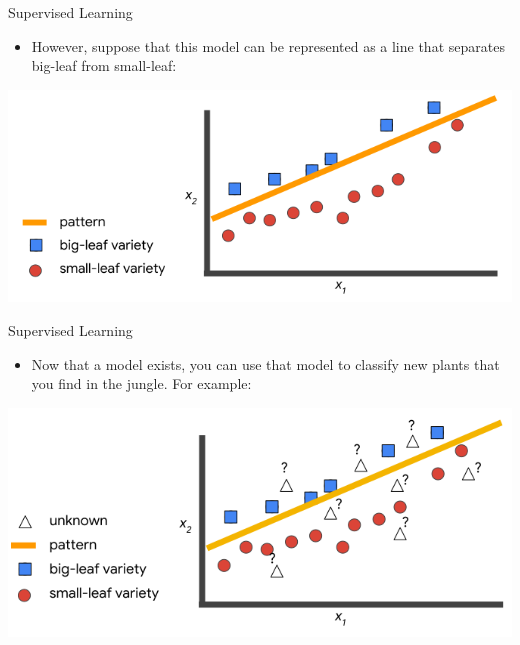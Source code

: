 \documentclass{beamer}
\begin{document}
\begin{frame}{Supervised Learning}

\begin{itemize}

\item However, suppose that this model can be represented as a line that separates big-leaf from small-leaf:

\end{itemize}

\bigskip

\includegraphics[width=\textwidth]{images/Graph2.png}

\end{frame}


\begin{frame}{Supervised Learning}

\begin{itemize}
\item Now that a model exists, you can use that model to classify new plants that you find in the jungle. For example:
\end{itemize}

\bigskip

\includegraphics[width=\textwidth]{images/Graph3.png}

\end{frame}
\end{document}
